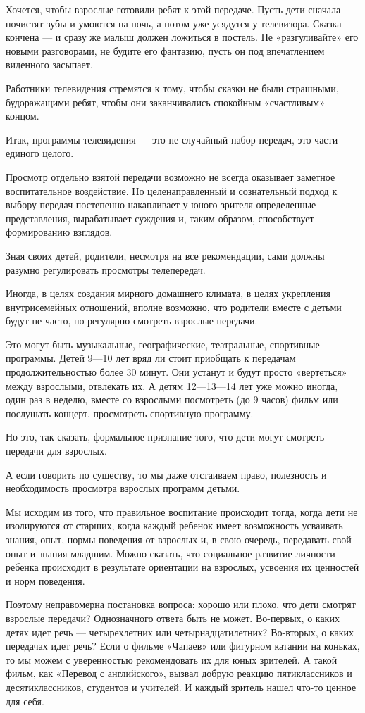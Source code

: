\documentclass[12pt, a4paper, openany]{book}
\begin{document}
Хочется, чтобы взрослые готовили ребят к этой передаче. Пусть дети сначала почистят зубы и умоются на ночь, а потом уже усядутся у телевизора. Сказка кончена — и сразу же малыш должен ложиться в постель. Не «разгуливайте» его новыми разговорами, не будите его фантазию, пусть он под впечатлением виденного засыпает. 

Работники телевидения стремятся к тому, чтобы сказки не были страшными, будоражащими ребят, чтобы они заканчивались спокойным «счастливым» концом. 

Итак, программы телевидения — это не случайный набор передач, это части единого целого. 

Просмотр отдельно взятой передачи возможно не всегда оказывает заметное воспитательное воздействие. Но целенаправленный и сознательный подход к выбору передач постепенно накапливает у юного зрителя определенные представления, вырабатывает суждения и, таким образом, способствует формированию взглядов. 

Зная своих детей, родители, несмотря на все рекомендации, сами должны разумно регулировать просмотры телепередач. 

Иногда, в целях создания мирного домашнего климата, в целях укрепления внутрисемейных отношений, вполне возможно, что родители вместе с детьми будут не часто, но регулярно смотреть взрослые передачи. 

Это могут быть музыкальные, географические, театральные, спортивные программы. Детей 9—10 лет вряд ли стоит приобщать к передачам продолжительностью более 30 минут. Они устанут и будут просто «вертеться» между взрослыми, отвлекать их. А детям 12—13—14 лет уже можно иногда, один раз в неделю, вместе со взрослыми посмотреть (до 9 часов) фильм или послушать концерт, просмотреть спортивную программу. 

Но это, так сказать, формальное признание того, что дети могут смотреть передачи для взрослых. 

А если говорить по существу, то мы даже отстаиваем право, полезность и необходимость просмотра взрослых программ детьми. 

Мы исходим из того, что правильное воспитание происходит тогда, когда дети не изолируются от старших, когда каждый ребенок имеет возможность усваивать знания, опыт, нормы поведения от взрослых и, в свою очередь, передавать свой опыт и знания младшим. Можно сказать, что социальное развитие личности ребенка происходит в результате ориентации на взрослых, усвоения их ценностей и норм поведения. 

Поэтому неправомерна постановка вопроса: хорошо или плохо, что дети смотрят взрослые передачи? Однозначного ответа быть не может. Во-первых, о каких детях идет речь — четырехлетних или четырнадцатилетних? Во-вторых, о каких передачах идет речь? Если о фильме «Чапаев» или фигурном катании на коньках, то мы можем с уверенностью рекомендовать их для юных зрителей. А такой фильм, как «Перевод с английского», вызвал добрую реакцию пятиклассников и десятиклассников, студентов и учителей. И каждый зритель нашел что-то ценное для себя. 
\end{document}

